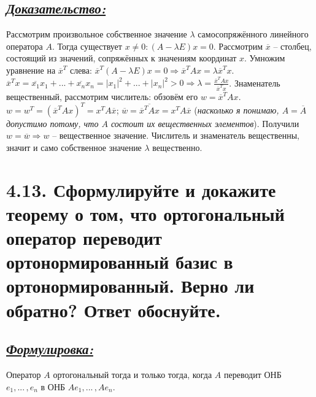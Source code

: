 \documentclass{article}
\begin{document}
\subsection*{\Large \underline{\textit{Доказательство: }}}
Рассмотрим произвольное собственное значение $\lambda$ самосопряжённого линейного оператора $A$. Тогда существует $x \ne 0 : (A - \lambda E)x = 0$. Рассмотрим $\overline{x}$ -- столбец, состоящий из значений, сопряжённых к значениям координат $x$. Умножим уравнение на $\overline{x}^T$ слева: $\overline{x}^T(A - \lambda E)x = 0 \Rightarrow \overline{x}^TAx = \lambda\overline{x}^Tx$. 
\newline $\overline{x}^Tx = \overline{x_1}x_1 + ... + \overline{x_n}x_n = |x_1|^2 + ... + |x_n|^2 > 0 \Rightarrow \boxed{\lambda = \frac{\overline{x}^TAx}{\overline{x}^Tx}}$. 
\newline Знаменатель вещественный, рассмотрим числитель: обзовём его $w = \overline{x}^TAx$. 
\newline $w = w^T = (\overline{x}^TAx)^T = x^TA\overline{x}$; $\overline{w} = \overline{\overline{x}^TAx} = x^TA\overline{x}$ (\textit{насколько я понимаю, $A = \overline{A}$ допустимо потому, что $A$ состоит их вещественных элементов}). Получили $w = \overline{w} \Rightarrow w$ -- вещественное значение. Числитель и знаменатель вещественны, значит и само собственное значение $\lambda$ вещественно.

\section*{\LARGE 4.13. Сформулируйте и докажите теорему о том, что ортогональный оператор переводит ортонормированный базис в ортонормированный. Верно ли обратно? Ответ обоснуйте.  }
\subsection*{\Large \underline{\textit{Формулировка: }}}
Оператор $A$ ортогональный тогда и только тогда, когда $A$ переводит ОНБ $e_1, ...\,, e_n$ в ОНБ $Ae_1, ...\,, Ae_n$.
\end{document}
